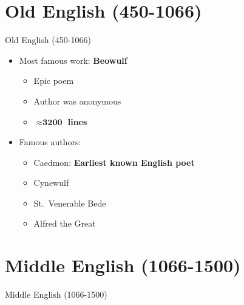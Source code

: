 \documentclass[
  12pt,
    progressbar=frametitle]{beamer}
\providecommand{\tightlist}{%
  \setlength{\itemsep}{0pt}\setlength{\parskip}{0pt}}
\begin{document}
\section{Old English (450-1066)}
\begin{frame}[allowframebreaks]
{Old English (450-1066)}
\begin{itemize}
\tightlist
\item
  Most famous work: \textbf{Beowulf}

  \begin{itemize}
  \tightlist
  \item
    Epic poem
  \item
    Author was anonymous
  \item
    \textbf{\(\boldsymbol\approx \textbf{3200}\) lines}
  \end{itemize}
\item
  Famous authors:

  \begin{itemize}
  \tightlist
  \item
    Caedmon: \textbf{Earliest known English poet}
  \item
    Cynewulf
  \item
    St.~Venerable Bede
  \item
    Alfred the Great
  \end{itemize}
\end{itemize}
\end{frame}

\section{Middle English (1066-1500)}
\begin{frame}[allowframebreaks]
{Middle English (1066-1500)}
\end{frame}
\end{document}
